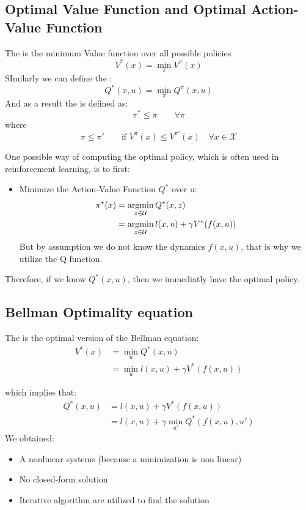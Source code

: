 \subsection{Optimal Value Function and Optimal Action-Value Function}
The  is the minimum Value function over all possible policies
\[V^*(x) = \min_{\pi}V^{\pi}(x)\]
SImilarly we can define the :
\[Q^*(x,u) = \min_{\pi}Q^{\pi}(x,u)\]
And as a result the  is defined as:
\[\pi^* \le \pi \qquad \forall \pi\]
where
\[\pi\le\pi'\qquad\text{if } V^{\pi}(x) \le V^{\pi'}(x)\quad \forall x \in \mathcal{X}\]

One possible way of computing the optimal policy, which is often used in reinforcement learning, is to first:
\begin{itemize}
\item Minimize the Action-Value Function $Q^*$ over u:
\begin{align*}
\pi^*(x) &= \operatorname*{argmin}_{z\in\mathcal{U}}Q^*(x,z)\\
&= \operatorname*{argmin}_{z\in\mathcal{U}} l(x,u) + \gamma V^*(f(x,u))
\end{align*}
But by assumption we do not know the dynamics $f(x,u)$, that is why we utilize the Q function.
\end{itemize}

Therefore, if we know $Q^*(x,u)$, then we immediatly have the optimal policy.

\subsection{Bellman Optimality equation}
The  is the optimal version of the Bellman equation:
\begin{align*}
V^*(x) &= \min_u Q^*(x,u)\\
&= \min_u l(x,u) + \gamma V^*(f(x,u))
\end{align*}

which implies that:
\begin{align*}
Q^*(x,u)&=l(x,u) + \gamma V^*(f(x,u))\\
&= l(x,u) + \gamma \min_{u'} Q^*(f(x,u),u')
\end{align*}
We obtained:
\begin{itemize}
\item A nonlinear systems (because a minimization is non linear)
\item No closed-form solution
\item Iterative algorithm are utilized to find the solution
\end{itemize}

